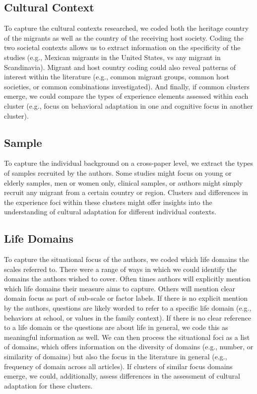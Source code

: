 \documentclass[man, 12pt, a4paper]{apa7}
\begin{document}
\subsection{Cultural Context}
To capture the cultural contexts researched, we coded both the heritage country of the migrants as well as the country of the receiving host society. Coding the two societal contexts allows us to extract information on the specificity of the studies (e.g., Mexican migrants in the United States, vs any migrant in Scandinavia). Migrant and host country coding could also reveal patterns of interest within the literature (e.g., common migrant groups, common host societies, or common combinations investigated). And finally, if common clusters emerge, we could compare the types of experience elements assessed within each cluster (e.g., focus on behavioral adaptation in one and cognitive focus in another cluster). 

\subsection{Sample}
To capture the individual background on a cross-paper level, we extract the types of samples recruited by the authors. Some studies might focus on young or elderly samples, men or women only, clinical samples, or authors might simply recruit any migrant from a certain country or region. Clusters and differences in the experience foci within these clusters might offer insights into the understanding of cultural adaptation for different individual contexts.

\subsection{Life Domains}
To capture the situational focus of the authors, we coded which life domains the scales referred to. There were a range of ways in which we could identify the domains the authors wished to cover. Often times authors will explicitly mention which life domains their measure aims to capture. Others will mention clear domain focus as part of sub-scale or factor labels. If there is no explicit mention by the authors, questions are likely worded to refer to a specific life domain (e.g., behaviors at school, or values in the family context). If there is no clear reference to a life domain or the questions are about life in general, we code this as meaningful information as well. We can then process the situational foci as a list of domains, which offers information on the diversity of domains (e.g., number, or similarity of domains) but also the focus in the literature in general (e.g., frequency of domain across all articles). If clusters of similar focus domains emerge, we could, additionally, assess differences in the assessment of cultural adaptation for these clusters.
\end{document}
